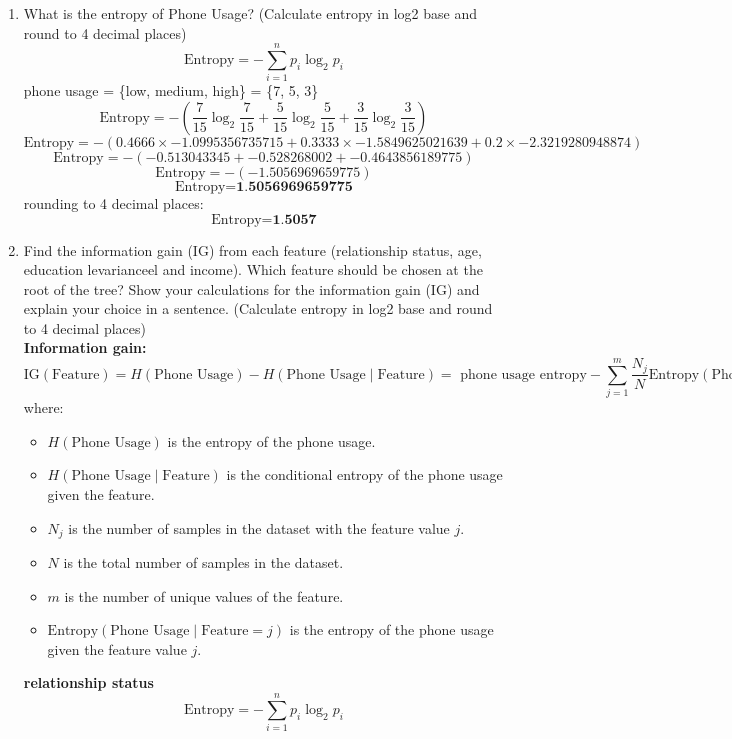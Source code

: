 \documentclass[a3paper,12pt]{extarticle} %
\begin{document}
\begin{enumerate}
    \item What is the entropy of Phone Usage? (Calculate entropy in log2 base and round to 4 decimal places)
    \[
    \text{Entropy} = -\sum_{i=1}^n p_i \log_2 p_i
    \]
    phone usage = \{low, medium, high\} = \{7, 5, 3\}
    \[
    \text{Entropy} = -\left(\frac{7}{15} \log_2 \frac{7}{15} + \frac{5}{15} \log_2 \frac{5}{15} + \frac{3}{15} \log_2 \frac{3}{15}\right)
    \]
    \[
    \text{Entropy} = -\left(0.4666 \times -1.0995356735715 + 0.3333 \times -1.5849625021639 + 0.2 \times -2.3219280948874\right)
    \]
    \[
    \text{Entropy} = -\left(-0.513043345 + -0.528268002 + -0.4643856189775\right)
    \]
    \[
    \text{Entropy} = -\left(-1.5056969659775\right)
    \]
    \[
    \text{Entropy} = \textbf{1.5056969659775}
    \]
    rounding to 4 decimal places:
    \[
    \text{Entropy} = \textbf{1.5057}
    \]
    \item Find the information gain (IG) from each feature (relationship status, age, education levarianceel and income). Which feature should be chosen at the root of the tree? Show your calculations for the information gain (IG) and explain your choice in a sentence. (Calculate entropy in log2 base and round to 4 decimal places)
    \\ \textbf{Information gain:}
    \[
    \text{IG}(\text{Feature}) = H(\text{Phone Usage}) - H(\text{Phone Usage} \mid \text{Feature}) = \text{ phone usage entropy} - \sum_{j=1}^m \frac{N_j}{N} \text{Entropy}(\text{Phone Usage} \mid \text{Feature} = j)
    \]
    where:
    \begin{itemize}
        \item $H(\text{Phone Usage})$ is the entropy of the phone usage.
        \item $H(\text{Phone Usage} \mid \text{Feature})$ is the conditional entropy of the phone usage given the feature.
        \item $N_j$ is the number of samples in the dataset with the feature value $j$.
        \item $N$ is the total number of samples in the dataset.
        \item $m$ is the number of unique values of the feature.
        \item $\text{Entropy}(\text{Phone Usage} \mid \text{Feature} = j)$ is the entropy of the phone usage given the feature value $j$.
    \end{itemize}
    \textbf{relationship status}
    \[
    \text{Entropy} = -\sum_{i=1}^n p_i \log_2 p_i
\]
\end{enumerate}
\end{document}
